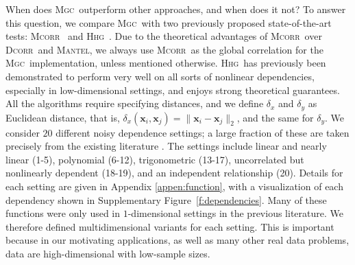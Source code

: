 \documentclass[11pt]{article}
\providecommand{\sct}[1]{{\normalfont\textsc{#1}}}
\providecommand{\mb}[1]{\boldsymbol{#1}}
\newcommand{\Mgc}{\sct{Mgc}}
\newcommand{\Hhg}{\sct{Hhg}}
\newcommand{\Dcorr}{\sct{Dcorr}}
\newcommand{\Mcorr}{\sct{Mcorr}}
\newcommand{\Mantel}{\sct{Mantel}}
\begin{document}
When does \Mgc~outperform other approaches, and when does it not?
To answer this question, we compare  \Mgc~with two previously proposed state-of-the-art tests: \Mcorr~\cite{SzekelyRizzo2013a} and \Hhg~\cite{HellerGorfine2013}. Due to the theoretical advantages of \Mcorr~over \Dcorr~and \Mantel, we always use \Mcorr~as the global correlation for the \Mgc~implementation, unless mentioned otherwise. \Hhg~has previously been demonstrated to perform very well on all sorts of nonlinear dependencies, especially in low-dimensional settings, and enjoys strong theoretical guarantees. 
All the algorithms require specifying distances, and we define  $\delta_x$ and $\delta_y$  as  Euclidean distance, that is, $\delta_x(\mb{x}_i,\mb{x}_j) = \|\mb{x}_i - \mb{x}_j\|_{2}$, and the same for $\delta_y$. 
We consider $20$ different noisy dependence settings;  a large fraction of these are taken precisely from the existing literature \cite{SzekelyRizzoBakirov2007, SimonTibshirani2012, GorfineHellerHeller2012, HellerGorfine2013, SzekelyRizzo2013a}.  
The settings include
linear and nearly linear  (1-5),
polynomial   (6-12),
trigonometric (13-17),
uncorrelated but nonlinearly dependent  (18-19),
and an independent relationship (20).
Details for each setting are given in Appendix \ref{appen:function}, with a visualization of each dependency shown in Supplementary Figure~\ref{f:dependencies}.  Many of these functions were only used in $1$-dimensional settings in the previous literature.  We therefore defined multidimensional variants for each setting.  This is important because in our motivating applications, as well as many other real data problems, data are high-dimensional with low-sample sizes. 
\end{document}
